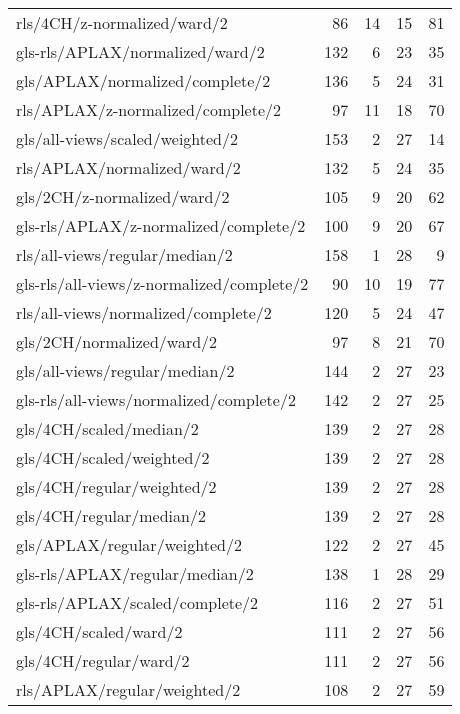 \begin{longtable}{lrrrr}
    rls/4CH/z-normalized/ward/2               &  86 & 14 & 15 & 81 \\
    gls-rls/APLAX/normalized/ward/2           & 132 &  6 & 23 & 35 \\
    gls/APLAX/normalized/complete/2           & 136 &  5 & 24 & 31 \\
    rls/APLAX/z-normalized/complete/2         &  97 & 11 & 18 & 70 \\
    gls/all-views/scaled/weighted/2           & 153 &  2 & 27 & 14 \\
    rls/APLAX/normalized/ward/2               & 132 &  5 & 24 & 35 \\
    gls/2CH/z-normalized/ward/2               & 105 &  9 & 20 & 62 \\
    gls-rls/APLAX/z-normalized/complete/2     & 100 &  9 & 20 & 67 \\
    rls/all-views/regular/median/2            & 158 &  1 & 28 &  9 \\
    gls-rls/all-views/z-normalized/complete/2 &  90 & 10 & 19 & 77 \\
    rls/all-views/normalized/complete/2       & 120 &  5 & 24 & 47 \\
    gls/2CH/normalized/ward/2                 &  97 &  8 & 21 & 70 \\
    gls/all-views/regular/median/2            & 144 &  2 & 27 & 23 \\
    gls-rls/all-views/normalized/complete/2   & 142 &  2 & 27 & 25 \\
    gls/4CH/scaled/median/2                   & 139 &  2 & 27 & 28 \\
    gls/4CH/scaled/weighted/2                 & 139 &  2 & 27 & 28 \\
    gls/4CH/regular/weighted/2                & 139 &  2 & 27 & 28 \\
    gls/4CH/regular/median/2                  & 139 &  2 & 27 & 28 \\
    gls/APLAX/regular/weighted/2              & 122 &  2 & 27 & 45 \\
    gls-rls/APLAX/regular/median/2            & 138 &  1 & 28 & 29 \\
    gls-rls/APLAX/scaled/complete/2           & 116 &  2 & 27 & 51 \\
    gls/4CH/scaled/ward/2                     & 111 &  2 & 27 & 56 \\
    gls/4CH/regular/ward/2                    & 111 &  2 & 27 & 56 \\
    rls/APLAX/regular/weighted/2              & 108 &  2 & 27 & 59 \\

\end{longtable}
